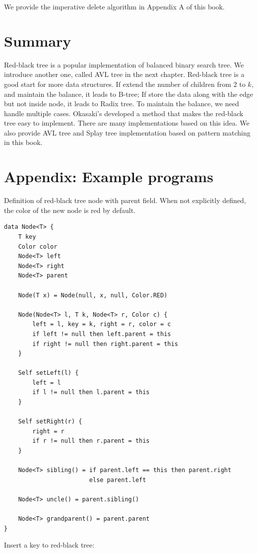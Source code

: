 \documentclass[b5paper]{article}
\begin{document}
We provide the imperative delete algorithm in Appendix A of this book.

\section{Summary}
Red-black tree is a popular implementation of balanced binary search tree. We introduce another one, called AVL tree in the next chapter. Red-black tree is a good start for more data structures. If extend the number of children from 2 to $k$, and maintain the balance, it leads to B-tree; If store the data along with the edge but not inside node, it leads to Radix tree. To maintain the balance, we need handle multiple cases. Okasaki's developed a method that makes the red-black tree easy to implement. There are many implementations based on this idea\cite{rosetta}. We also provide AVL tree and Splay tree implementation based on pattern matching in this book.

\section{Appendix: Example programs}

Definition of red-black tree node with parent field. When not explicitly defined, the color of the new node is red by default.

\begin{lstlisting}[language = Bourbaki]
data Node<T> {
    T key
    Color color
    Node<T> left
    Node<T> right
    Node<T> parent

    Node(T x) = Node(null, x, null, Color.RED)

    Node(Node<T> l, T k, Node<T> r, Color c) {
        left = l, key = k, right = r, color = c
        if left != null then left.parent = this
        if right != null then right.parent = this
    }

    Self setLeft(l) {
        left = l
        if l != null then l.parent = this
    }

    Self setRight(r) {
        right = r
        if r != null then r.parent = this
    }

    Node<T> sibling() = if parent.left == this then parent.right
                        else parent.left

    Node<T> uncle() = parent.sibling()

    Node<T> grandparent() = parent.parent
}
\end{lstlisting}

Insert a key to red-black tree:
\end{document}
